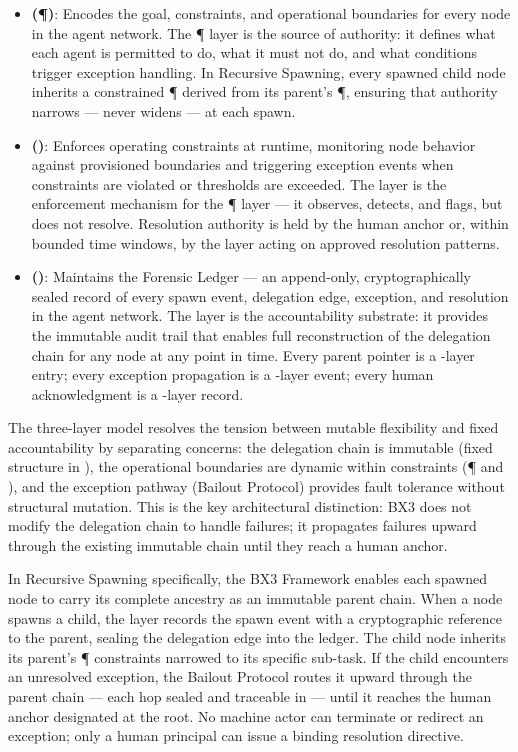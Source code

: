 \begin{itemize}
\item \textbf{\purpose{} (\P{})}: Encodes the goal, constraints, and operational boundaries for every node in the agent network. The \P{} layer is the source of authority: it defines what each agent is permitted to do, what it must not do, and what conditions trigger exception handling. In Recursive Spawning, every spawned child node inherits a constrained \P{} derived from its parent's \P{}, ensuring that authority narrows — never widens — at each spawn.

\item \textbf{\bounds{} (\B{})}: Enforces operating constraints at runtime, monitoring node behavior against provisioned boundaries and triggering exception events when constraints are violated or thresholds are exceeded. The \B{} layer is the enforcement mechanism for the \P{} layer — it observes, detects, and flags, but does not resolve. Resolution authority is held by the human anchor or, within bounded time windows, by the \fact{} layer acting on approved resolution patterns.

\item \textbf{\fact{} (\F{})}: Maintains the Forensic Ledger — an append-only, cryptographically sealed record of every spawn event, delegation edge, exception, and resolution in the agent network. The \F{} layer is the accountability substrate: it provides the immutable audit trail that enables full reconstruction of the delegation chain for any node at any point in time. Every parent pointer is a \F{}-layer entry; every exception propagation is a \F{}-layer event; every human acknowledgment is a \F{}-layer record.
\end{itemize}

The three-layer model resolves the tension between mutable flexibility and fixed accountability by separating concerns: the delegation chain is immutable (fixed structure in \F{}), the operational boundaries are dynamic within constraints (\P{} and \B{}), and the exception pathway (Bailout Protocol) provides fault tolerance without structural mutation. This is the key architectural distinction: BX3 does not modify the delegation chain to handle failures; it propagates failures upward through the existing immutable chain until they reach a human anchor.

In Recursive Spawning specifically, the BX3 Framework enables each spawned node to carry its complete ancestry as an immutable parent chain. When a node spawns a child, the \F{} layer records the spawn event with a cryptographic reference to the parent, sealing the delegation edge into the ledger. The child node inherits its parent's \P{} constraints narrowed to its specific sub-task. If the child encounters an unresolved exception, the Bailout Protocol routes it upward through the parent chain — each hop sealed and traceable in \F{} — until it reaches the human anchor designated at the root. No machine actor can terminate or redirect an exception; only a human principal can issue a binding resolution directive.

